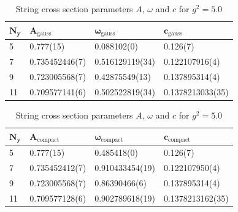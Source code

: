 \begin{table}[!hb]
\centering
\begin{tabular}{llll}
    $\mathbf{N_y}$ & $\mathbf{A_\mathrm{gauss}}$ & $\mathbf{\omega_\mathrm{gauss}}$ & $\mathbf{c_\mathrm{gauss}}$ \\ \hline
   5 & 0.777(15) & 0.088102(0) & 0.126(7) \\
   7 & 0.735452446(7) & 0.516129119(34) & 0.122107916(4) \\
   9 & 0.723005568(7) & 0.42875549(13) & 0.137895314(4) \\
   11 & 0.709577141(6) & 0.502522819(34) & 0.1378213033(35) \\
\end{tabular}
\begin{tabular}{llll}
    $\mathbf{N_y}$ & $\mathbf{A_\mathrm{compact}}$ & $\mathbf{\omega_\mathrm{compact}}$ & $\mathbf{c_\mathrm{compact}}$ \\ \hline
   5 & 0.777(15) & 0.485418(0) & 0.126(7) \\
   7 & 0.735452412(7) & 0.910433454(19) & 0.122107950(4) \\
   9 & 0.723005568(7) & 0.86390466(6) & 0.137895314(4) \\
   11 & 0.709577128(6) & 0.902789618(19) & 0.1378213162(35) \\
\end{tabular}
\caption{String cross section parameters $A$, $\omega$ and $c$ for $g^2=5.0$}
\end{table}
